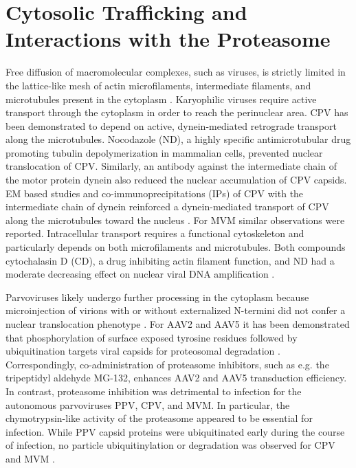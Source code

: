 
    
\section{Cytosolic Trafficking and Interactions with the Proteasome}
Free diffusion of macromolecular complexes, such as viruses, is strictly limited in the lattice-like mesh of actin microfilaments, intermediate filaments, and microtubules present in the cytoplasm \cite{pmid10553280, pmid9214387}. Karyophilic viruses require active transport through the cytoplasm in order to reach the perinuclear area. CPV has been demonstrated to depend on active, dynein-mediated retrograde transport along the microtubules. Nocodazole (ND), a highly specific antimicrotubular drug promoting tubulin depolymerization in mammalian cells, prevented nuclear translocation of CPV. Similarly, an antibody against the intermediate chain of the motor protein dynein also reduced the nuclear accumulation of CPV capsids. EM based studies and co-immunoprecipitations (IPs) of CPV with the intermediate chain of dynein reinforced a dynein-mediated transport of CPV along the microtubules toward the nucleus \cite{pmid12970411, pmid11932407, pmid10775624}. For MVM similar observations were reported. Intracellular transport requires a functional cytoskeleton and particularly depends on both microfilaments and microtubules. Both compounds cytochalasin D (CD), a drug inhibiting actin filament function, and ND had a moderate decreasing effect on nuclear viral DNA amplification \cite{pmid12438589}.  


Parvoviruses likely undergo further processing in the cytoplasm because microinjection of virions with or without externalized N-termini did not confer a nuclear translocation phenotype \cite{pmid10644365, pmid16956943, pmid14644609, pmid11932407}. For AAV2 and AAV5 it has been demonstrated that phosphorylation of surface exposed tyrosine residues followed by ubiquitination targets viral capsids for proteosomal degradation \cite{pmid11836382, pmid18834608, pmid18511559}. Correspondingly, co-administration of proteasome inhibitors, such as e.g. the tripeptidyl aldehyde MG-132, enhances AAV2 and AAV5 transduction efficiency. In contrast, proteasome inhibition was detrimental to infection for the autonomous parvoviruses PPV, CPV, and MVM. In particular, the chymotrypsin-like activity of the proteasome appeared to be essential for infection. While PPV capsid proteins were ubiquitinated early during the course of infection, no particle ubiquitinylation or degradation was observed for CPV and MVM \cite{pmid20484503, pmid12438589, pmid15207621}.


